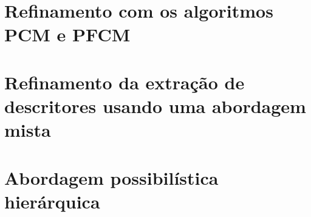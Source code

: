 
\section{Refinamento com os algoritmos PCM e PFCM}


\section{Refinamento da extração de descritores usando uma abordagem mista}


\section{Abordagem possibilística hierárquica}
